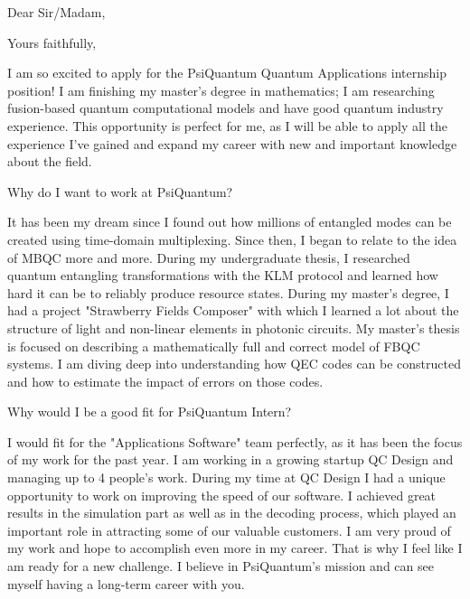\documentclass[12pt,a4paper,sans]{moderncv}        %
\begin{document}
	\clearpage
	\date{\today}
	\opening{Dear Sir/Madam,}
	\closing{Yours faithfully,}
	\makelettertitle
	I am so excited to apply for the PsiQuantum Quantum Applications internship position! I am finishing my master's degree in mathematics; I am researching fusion-based quantum computational models and have good quantum industry experience. This opportunity is perfect for me, as I will be able to apply all the experience I've gained and expand my career with new and important knowledge about the field.
	
	Why do I want to work at PsiQuantum?
	
	It has been my dream since I found out how millions of entangled modes can be created using time-domain multiplexing. Since then, I began to relate to the idea of MBQC more and more. During my undergraduate thesis, I researched quantum entangling transformations with the KLM protocol and learned how hard it can be to reliably produce resource states. During my master's degree, I had a project "Strawberry Fields Composer" with which I learned a lot about the structure of light and non-linear elements in photonic circuits. My master's thesis is focused on describing a mathematically full and correct model of FBQC systems. I am diving deep into understanding how QEC codes can be constructed and how to estimate the impact of errors on those codes.
	
	Why would I be a good fit for PsiQuantum Intern?

	I would fit for the "Applications Software" team perfectly, as it has been the focus of my work for the past year. I am working in a growing startup QC Design and managing up to 4 people's work. During my time at QC Design I had a unique opportunity to work on improving the speed of our software. I achieved great results in the simulation part as well as in the decoding process, which played an important role in attracting some of our valuable customers. I am very proud of my work and hope to accomplish even more in my career. That is why I feel like I am ready for a new challenge. I believe in PsiQuantum's mission and can see myself having a long-term career with you.
	
\end{document}
